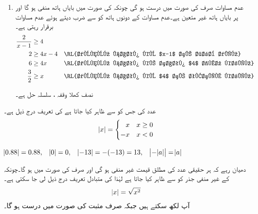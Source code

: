\begin{enumerate}[1)]
\item
عدم مساوات  صرف  کی صورت میں درست ہو گی چونکہ  کی صورت میں بایاں ہاتھ منفی ہو گا اور  پر بایاں ہاتھ غیر متعین ہے۔عدم مساوات کے دونوں ہاتھ کو  سے ضرب دیتے ہوئے عدم مساوات برقرار رہتی ہے۔
\begin{align*}
\frac{2}{x-1}&\ge 4\\
2&\ge 4x-4&&\text{\RL{دونوں ہاتھ کو $x-1$ سے ضرب دیں}}\\
6&\ge 4x&&\text{\RL{دونوں ہاتھ کے ساتھ $4$ جمع کریں}}\\
\frac{3}{2}&\ge x&&\text{\RL{دونوں ہاتھ کو $4$ سے تقسیم کریں}}
\end{align*}
%
\begin{center}
\end{center}
نصف کھلا وقفہ \عددی{(1,\tfrac{3}{2}]}،  سلسلہ حل  ہے۔
\end{enumerate}
عدد  کی  جس کو  سے ظاہر کیا جاتا ہے کی  تعریف درج ذیل ہے۔
\begin{align*}
\abs{x}=
\begin{cases}
\phantom{-}x&x\ge 0\\
-x&x<0
\end{cases}
\end{align*}

$\abs{0.88}=0.88,\quad \abs{0}=0,\quad \abs{-13}=-(-13)=13,\quad \abs{-\abs{a}}=\abs{a}$

دھیان رہے کہ ہر حقیقی عدد کی مطلق قیمت غیر منفی  ہو گی اور صرف  کی صورت میں  ہو گا۔چونکہ  کے  غیر منفی  جذر کو  سے ظاہر کیا جاتا ہے لہٰذا  کی متبادل تعریف درج ذیل لی جا سکتی ہے۔
\begin{align*}
\abs{x}=\sqrt{x^2}
\end{align*} 
آپ  لکھ سکتے ہیں جبکہ  صرف مثبت  کی صورت میں درست ہو گا۔ 

